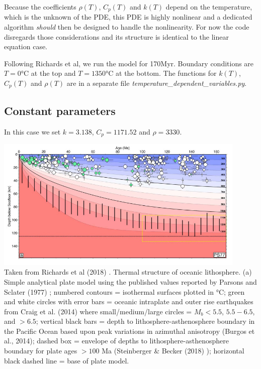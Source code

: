Because the coefficients $\rho(T)$, $C_p(T)$ and $k(T)$ depend on the temperature, which is the unknown 
of the PDE, this PDE is highly nonlinear and a dedicated algorithm {\it should} then be designed to handle the 
nonlinearity. For now the code disregards those considerations and its structure is identical to the linear equation case.

Following Richards et al, we run the model for 170Myr. Boundary conditions are $T=0\si{\celsius}$ 
at the top and $T=1350\si{\celsius}$ at the bottom. The functions for $k(T)$, $C_p(T)$ and $\rho(T)$
are in a separate file {\sl temperature\_dependent\_variables.py}.

\subsection*{Constant parameters}

In this case we set $k=3.138$, $C_p=1171.52$ and $\rho=3330$.


\begin{center}
\includegraphics[width=12cm]{python_codes/fieldstone_83/images/rihc18a}\\
{\captionfont Taken from Richards et al (2018) \cite{rihc18}.
Thermal structure of oceanic lithosphere. 
(a) Simple analytical plate model using the published values reported by Parsons and Sclater (1977) \cite{pasc77}; 
numbered contours = isothermal surfaces plotted in \si{\celsius}; 
green and white circles with error bars = oceanic intraplate and outer rise earthquakes 
from Craig et al. (2014) where small/medium/large circles 
= $M_b < 5.5$, $5.5-6.5$, and $> 6.5$; 
vertical black bars = depth to lithosphere-asthenosphere boundary in the Pacific Ocean
based upon peak variations in azimuthal anisotropy (Burgos et al., 2014); 
dashed box = envelope of depths to lithosphere-asthenosphere boundary for plate 
ages $>100$ Ma (Steinberger \& Becker (2018) \cite{stbe18}); 
horizontal black dashed line = base of plate model. 
} 
\end{center}


